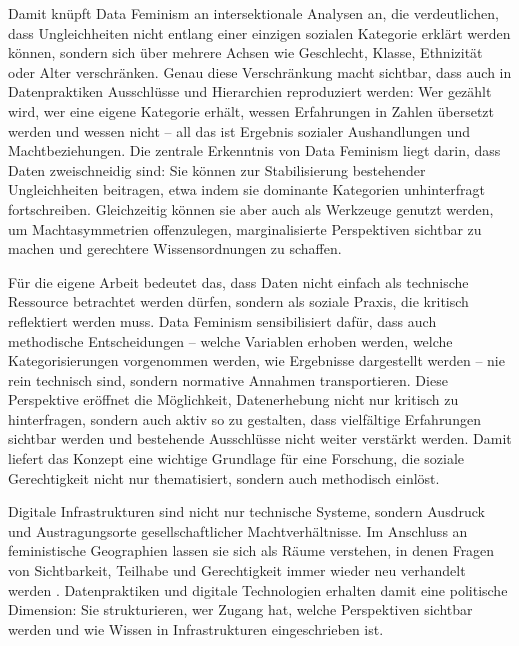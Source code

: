 Damit knüpft Data Feminism an intersektionale Analysen an, die verdeutlichen, dass Ungleichheiten nicht entlang einer einzigen sozialen Kategorie erklärt werden können, sondern sich über mehrere Achsen wie Geschlecht, Klasse, Ethnizität oder Alter verschränken. Genau diese Verschränkung macht sichtbar, dass auch in Datenpraktiken Ausschlüsse und Hierarchien reproduziert werden: Wer gezählt wird, wer eine eigene Kategorie erhält, wessen Erfahrungen in Zahlen übersetzt werden und wessen nicht -- all das ist Ergebnis sozialer Aushandlungen und Machtbeziehungen. Die zentrale Erkenntnis von Data Feminism liegt darin, dass Daten zweischneidig sind: Sie können zur Stabilisierung bestehender Ungleichheiten beitragen, etwa indem sie dominante Kategorien unhinterfragt fortschreiben. Gleichzeitig können sie aber auch als Werkzeuge genutzt werden, um Machtasymmetrien offenzulegen, marginalisierte Perspektiven sichtbar zu machen und gerechtere Wissensordnungen zu schaffen.

Für die eigene Arbeit bedeutet das, dass Daten nicht einfach als technische Ressource betrachtet werden dürfen, sondern als soziale Praxis, die kritisch reflektiert werden muss. Data Feminism sensibilisiert dafür, dass auch methodische Entscheidungen -- welche Variablen erhoben werden, welche Kategorisierungen vorgenommen werden, wie Ergebnisse dargestellt werden -- nie rein technisch sind, sondern normative Annahmen transportieren. Diese Perspektive eröffnet die Möglichkeit, Datenerhebung nicht nur kritisch zu hinterfragen, sondern auch aktiv so zu gestalten, dass vielfältige Erfahrungen sichtbar werden und bestehende Ausschlüsse nicht weiter verstärkt werden. Damit liefert das Konzept eine wichtige Grundlage für eine Forschung, die soziale Gerechtigkeit nicht nur thematisiert, sondern auch methodisch einlöst.

\vspace{1em}

Digitale Infrastrukturen sind nicht nur technische Systeme, sondern Ausdruck und Austragungsorte gesellschaftlicher Machtverhältnisse. Im Anschluss an feministische Geographien lassen sie sich als Räume verstehen, in denen Fragen von Sichtbarkeit, Teilhabe und Gerechtigkeit immer wieder neu verhandelt werden \parencite{elwoodFeministDigitalGeographies2018}. Datenpraktiken und digitale Technologien erhalten damit eine politische Dimension: Sie strukturieren, wer Zugang hat, welche Perspektiven sichtbar werden und wie Wissen in Infrastrukturen eingeschrieben ist.

